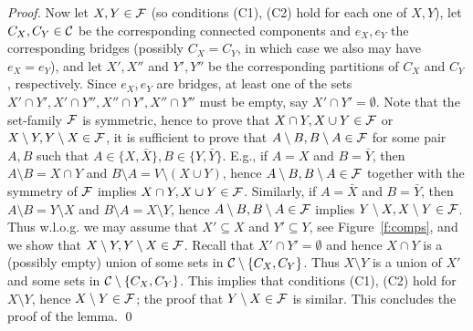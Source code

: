 \documentclass[envcountsame]{llncs}
\begin{document}
\begin{proof}
Now let $X,Y \in {\cal F}$ (so conditions (C1), (C2) hold for each one of $X,Y$), 
let $C_X,C_Y \in {\cal C}$ be the corresponding connected components and 
$e_X,e_Y$ the corresponding bridges 
(possibly $C_X=C_Y$, in which case we also may have $e_X=e_Y$), and let 
$X',X''$ and $Y',Y''$ be the corresponding partitions of $C_X$ and $C_Y$, respectively.
Since $e_X,e_Y$ are bridges, at least one of the sets 
$X' \cap Y',X' \cap Y'',X'' \cap Y',X'' \cap Y''$
must be empty, say $X' \cap Y'=\emptyset$.
Note that the set-family ${\cal F}$ is symmetric, hence to prove that 
$X \cap Y,X \cup Y \in {\cal F}$ or $X \setminus Y,Y \setminus X \in {\cal F}$,
it is sufficient to prove 
that $A \setminus B, B \setminus A \in {\cal F}$ 
for some pair $A,B$ such that $A \in \{X,\bar{X}\},B \in \{Y,\bar{Y}\}$.
E.g., if $A=X$ and $B=\bar{Y}$, then 
$A \setminus B=X \cap Y$ and $B \setminus A=V \setminus (X \cup Y)$, hence 
$A \setminus B, B \setminus A \in {\cal F}$ together with the 
symmetry of ${\cal F}$ implies $X \cap Y, X \cup Y \in {\cal F}$.
Similarly, if $A=\bar{X}$ and $B=\bar{Y}$, then 
$A \setminus B=Y \setminus X$ and 
$B \setminus A=X \setminus Y$, hence 
$A \setminus B, B \setminus A \in {\cal F}$  
implies $Y \setminus X, X \setminus Y \in {\cal F}$.
Thus w.l.o.g. we may assume that 
$X' \subseteq X$ and $Y' \subseteq Y$, see Figure~\ref{f:comps},
and we show that $X \setminus Y,Y \setminus X \in {\cal F}$.
Recall that $X' \cap Y' = \emptyset$ and
hence $X \cap Y$ is a (possibly empty) union of some sets in 
${\cal C} \setminus \{C_X,C_Y\}$.
Thus $X \setminus Y$ is a union of $X'$ and some sets in 
${\cal C} \setminus \{C_X,C_Y\}$.
This implies that conditions (C1), (C2) hold for $X \setminus Y$, hence 
$X \setminus Y \in {\cal F}$; the proof that
$Y \setminus X \in {\cal F}$ is similar.
This concludes the proof of the lemma.
\qed
\end{proof}
\end{document}
